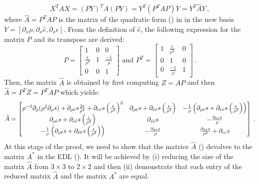 \documentclass[times,doublespace]{fldauth}%
\begin{document}
%
\begin{equation}
X^T A X =  (PY)^T A (PY) = Y^T (P^T A P) Y = Y^T \hat{A} Y \, ,
\end{equation}
%
where $\hat{A} = P^T A P$ is the matrix of the quadratic form () in in the new basis $Y=\left[ \partial_x \rho, \partial_x \hat{e},  \partial_x \epsilon \right]$. From the definition of $\hat{e}$, the following expression for the matrix $P$ and its transpose are derived:
%
\begin{equation}\label{eq:jac}
P =
\begin{bmatrix}
1 & 0 & 0 \\
\frac{\epsilon}{\rho^2} & 1 & \frac{-1}{\rho} \\
0 & 0 & 1
\end{bmatrix}
\text{ and }
P^T =
\begin{bmatrix}
1 & \frac{\epsilon}{\rho^2} & 0 \\
0 & 1 & 0 \\
0 & \frac{-1}{\rho} & 1
\end{bmatrix} \, .
\end{equation}
%
Then, the matrix $\hat{A}$ is obtained by first computing $Z=AP$ and then $\hat{A} = P^T Z = P^T A P$ which yields:
%
\begin{equation}\label{eq:gen-matrix}
\hat{A} = 
\begin{bmatrix}
\rho^{-2}\partial_{\rho}(\rho^2 \partial_{\rho} s) + \partial_{\rho \hat{e}} s\frac{2 \epsilon}{\rho^2} + \partial_{\hat{e} \hat{e}} s \left(\frac{\epsilon}{\rho^2}\right)^2 &
\partial_{\rho \hat{e}} s  + \partial_{\hat{e} \hat{e}} s \left(\frac{\epsilon}{\rho^2}\right) &
-\frac{1}{\rho} \left( \partial_{\rho \hat{e}} s  + \partial_{\hat{e} \hat{e}} s \left(\frac{\epsilon}{\rho^2}\right) \right) \\
\partial_{\rho \hat{e}} s  + \partial_{\hat{e} \hat{e}} s \left(\frac{\epsilon}{\rho^2}\right) &
\partial_{\hat{e} \hat{e}} s &
-\frac{\partial_{\hat{e} \hat{e}} s}{\rho} \\
-\frac{1}{\rho} \left( \partial_{\rho \hat{e}} s  + \partial_{\hat{e} \hat{e}} s \left(\frac{\epsilon}{\rho^2}\right) \right) &
-\frac{\partial_{\hat{e} \hat{e}} s}{\rho} &
\frac{\partial_{\hat{e} \hat{e}} s}{\rho^2} + \partial_{\epsilon \epsilon} s
\end{bmatrix} \, .
\end{equation}
%
At this stage of the proof, we need to show that the matrice $\hat{A}$ () devolves to the matrix $A^*$ in the EDL (). It will be achieved by (i) reducing the size of the matrix $\hat{A}$ from $3 \times 3$ to $2 \times 2$ and then (ii) demonstrate that each entry of the reduced matrix $\hat{A}$ and the matrix $A^*$ are equal.
\end{document}
